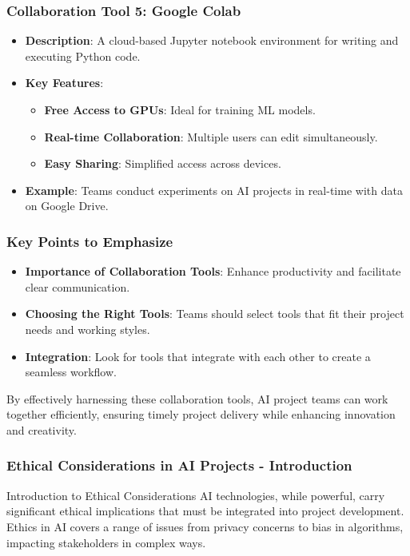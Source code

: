 \documentclass{beamer}
\begin{document}
\begin{frame}[fragile]
    \frametitle{Collaboration Tool 5: Google Colab}
    \begin{itemize}
        \item \textbf{Description}: A cloud-based Jupyter notebook environment for writing and executing Python code.
        \item \textbf{Key Features}:
            \begin{itemize}
                \item \textbf{Free Access to GPUs}: Ideal for training ML models.
                \item \textbf{Real-time Collaboration}: Multiple users can edit simultaneously.
                \item \textbf{Easy Sharing}: Simplified access across devices.
            \end{itemize}
        \item \textbf{Example}: Teams conduct experiments on AI projects in real-time with data on Google Drive.
    \end{itemize}
\end{frame}

\begin{frame}[fragile]
    \frametitle{Key Points to Emphasize}
    \begin{itemize}
        \item \textbf{Importance of Collaboration Tools}: Enhance productivity and facilitate clear communication.
        \item \textbf{Choosing the Right Tools}: Teams should select tools that fit their project needs and working styles.
        \item \textbf{Integration}: Look for tools that integrate with each other to create a seamless workflow.
    \end{itemize}
    
    By effectively harnessing these collaboration tools, AI project teams can work together efficiently, ensuring timely project delivery while enhancing innovation and creativity.
\end{frame}

\begin{frame}[fragile]
    \frametitle{Ethical Considerations in AI Projects - Introduction}
    \begin{block}{Introduction to Ethical Considerations}
        AI technologies, while powerful, carry significant ethical implications that must be integrated into project development. 
        Ethics in AI covers a range of issues from privacy concerns to bias in algorithms, impacting stakeholders in complex ways.
    \end{block}
\end{frame}
\end{document}

